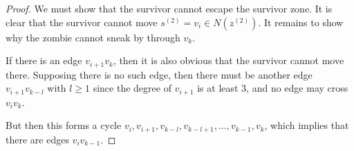\documentclass[letterpaper, 10pt]{article}
\begin{document}
\begin{proof}
We must show that the survivor cannot escape the survivor zone. It is clear that the survivor cannot
move $s^{(2)} = v_i \in N(z^{(2)})$. It remains to show why the zombie cannot sneak by through
$v_k$.

If there is an edge $v_{i+1}v_k$, then it is also obvious that the survivor cannot move there.
Supposing there is no such edge, then there must be another edge $v_{i+1}v_{k-l}$ with $l\geq 1$
since the degree of $v_{i+1}$ is at least 3, and no edge may cross $v_iv_k$.

But then this forms a cycle $v_{i}, v_{i+1}, v_{k-l}, v_{k-l+1}, \dots, v_{k-1}, v_k$, which
implies that there are edges $v_iv_{k-1}$.

\end{proof}



\end{document}
